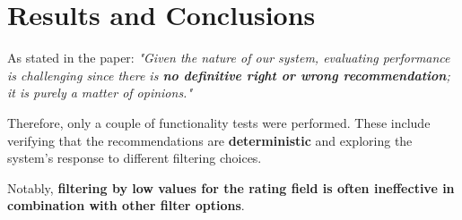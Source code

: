 \documentclass{Configuration_Files/Template}
\begin{document}
\chapter{Results and Conclusions}

As stated in the paper: \textit{"Given the nature of our system, evaluating performance is challenging since there is \textbf{no definitive right or wrong recommendation}; it is purely a matter of opinions."}

Therefore, only a couple of functionality tests were performed. These include verifying that the recommendations are \textbf{deterministic} and exploring the system's response to different filtering choices.

Notably, \textbf{filtering by low values for the rating field is often ineffective in combination with other filter options}.
\end{document}
